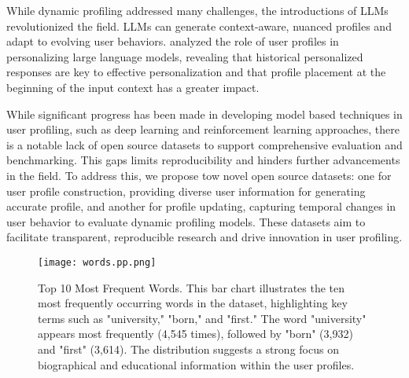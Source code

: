 While dynamic profiling addressed many challenges, the introductions of LLMs revolutionized the field. LLMs can generate context-aware, nuanced profiles and adapt to evolving user behaviors. \citet{wu2024understanding} analyzed the role of user profiles in personalizing large language models, revealing that historical personalized responses are key to effective personalization and that profile placement at the beginning of the input context has a greater impact.

While significant progress has been made in developing model based techniques in user profiling, such as deep learning and reinforcement learning approaches, there is a notable lack of open source datasets to support comprehensive evaluation and benchmarking. This gaps limits reproducibility and hinders further advancements in the field. To address this, we propose tow novel open source datasets: one for user profile construction, providing diverse user information for generating accurate profile, and another for profile updating, capturing temporal changes in user behavior to evaluate dynamic profiling models. These datasets aim to facilitate transparent, reproducible research and drive innovation in user profiling.


\begin{figure}[ht]
  \centering
  \texttt{[image: words.pp.png]}
  \caption{Top 10 Most Frequent Words. This bar chart illustrates the ten most frequently occurring words in the dataset, highlighting key terms such as "university," "born," and "first." The word "university" appears most frequently (4,545 times), followed by "born" (3,932) and "first" (3,614). The distribution suggests a strong focus on biographical and educational information within the user profiles.}
  \label{fig:bar_org}
\end{figure}